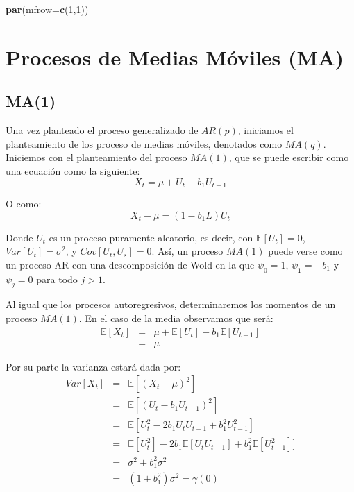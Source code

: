 \documentclass[
]{book}
\newenvironment{Shaded}{\begin{snugshade}}{\end{snugshade}}
\newcommand{\AttributeTok}[1]{\textcolor[rgb]{0.13,0.29,0.53}{#1}}
\newcommand{\DecValTok}[1]{\textcolor[rgb]{0.00,0.00,0.81}{#1}}
\newcommand{\FunctionTok}[1]{\textcolor[rgb]{0.13,0.29,0.53}{\textbf{#1}}}
\newcommand{\NormalTok}[1]{#1}
\begin{document}
\begin{Shaded}
\begin{Highlighting}[]
\FunctionTok{par}\NormalTok{(}\AttributeTok{mfrow=}\FunctionTok{c}\NormalTok{(}\DecValTok{1}\NormalTok{,}\DecValTok{1}\NormalTok{))}
\end{Highlighting}
\end{Shaded}

\hypertarget{procesos-de-medias-muxf3viles-ma}{%
\section{Procesos de Medias Móviles (MA)}\label{procesos-de-medias-muxf3viles-ma}}

\hypertarget{ma1}{%
\subsection{MA(1)}\label{ma1}}

Una vez planteado el proceso generalizado de \(AR(p)\), iniciamos el planteamiento de los proceso de medias móviles, denotados como \(MA(q)\). Iniciemos con el planteamiento del proceso \(MA(1)\), que se puede escribir como una ecuación como la siguiente:
\begin{equation}
    X_t = \mu + U_t - b_1 U_{t-1}
    \label{eq:MA1Eq}
\end{equation}

O como:
\begin{equation}
    X_t - \mu = (1 - b_1 L) U_{t}
\end{equation}

Donde \(U_t\) es un proceso puramente aleatorio, es decir, con \(\mathbb{E}[U_t] = 0\), \(Var[U_t] = \sigma^2\), y \(Cov[U_t, U_s] = 0\).
Así, un proceso \(MA(1)\) puede verse como un proceso AR con una descomposición de Wold en la que \(\psi_0 = 1\), \(\psi_1 = - b_1\) y
\(\psi_j = 0\) para todo \(j > 1\).

Al igual que los procesos autoregresivos, determinaremos los momentos de un proceso \(MA(1)\). En el caso de la media observamos que será:
\begin{eqnarray}
    \mathbb{E}[X_t] & = & \mu + \mathbb{E}[U_t] - b_1 \mathbb{E}[U_{t - 1}] \nonumber \\
    & = & \mu
\end{eqnarray}

Por su parte la varianza estará dada por:
\begin{eqnarray}
    Var[X_t] & = & \mathbb{E}[(X_t - \mu)^2] \nonumber \\
    & = & \mathbb{E}[(U_t - b_1 U_{t-1})^2] \nonumber \\
    & = & \mathbb{E}[U_t^2 - 2 b_1 U_t U_{t-1} + b_1^2 U_{t - 1}^2] \nonumber \\
    & = &\mathbb{E}[U_t^2] - 2 b_1 \mathbb{E}[U_t U_{t-1}] + b_1^2 \mathbb{E}[U_{t - 1}^2]] \nonumber \\
    & = & \sigma^2 + b_1^2 \sigma^2 \nonumber \\
    & = & (1 + b_1^2) \sigma^2 = \gamma(0)
\end{eqnarray}
\end{document}
